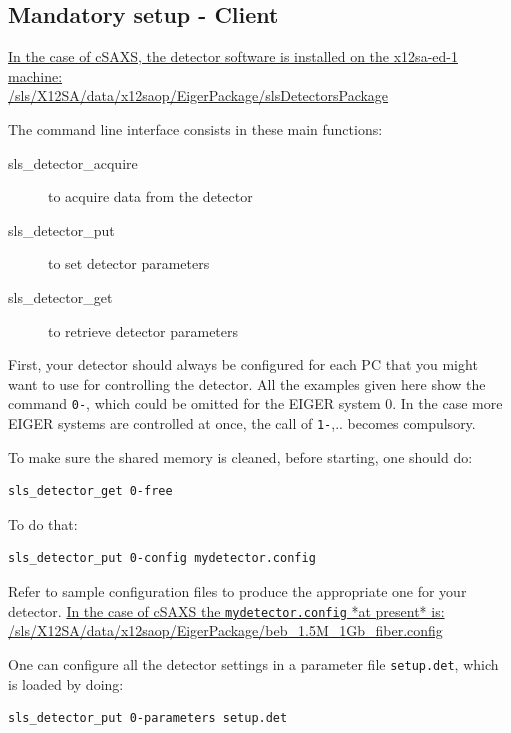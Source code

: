 \documentclass{article}
\begin{document}
\subsection{Mandatory setup - Client}

\underline{In the case of cSAXS, the detector software is installed on the x12sa-ed-1 machine:}\\
\underline{/sls/X12SA/data/x12saop/EigerPackage/slsDetectorsPackage}

The command line interface consists in these main functions:
\begin{description}
\item[sls\_detector\_acquire] to acquire data from the detector
\item[sls\_detector\_put] to set detector parameters
\item[sls\_detector\_get] to retrieve detector parameters
\end{description}

First, your detector should always be configured for each PC that you might want to use for controlling the detector. All the examples given here show the command {\tt{0-}}, which could be omitted for the EIGER system $0$. In the case more EIGER systems are controlled at once, the call of {\tt{1-}},.. becomes compulsory.

To make sure the shared memory is cleaned, before starting, one should do:  
\begin{verbatim}
sls_detector_get 0-free
\end{verbatim}
To do that:
\begin{verbatim}
sls_detector_put 0-config mydetector.config
\end{verbatim}
Refer to sample configuration files to produce the appropriate one for your detector.
\underline{In the case of cSAXS the {\tt{mydetector.config}} *at present* is:}\\ 
\underline{/sls/X12SA/data/x12saop/EigerPackage/beb\_1.5M\_1Gb\_fiber.config}

One can configure all the detector settings in a parameter file {\tt{setup.det}}, which is loaded by doing:
\begin{verbatim}
sls_detector_put 0-parameters setup.det
\end{verbatim}
\end{document}
